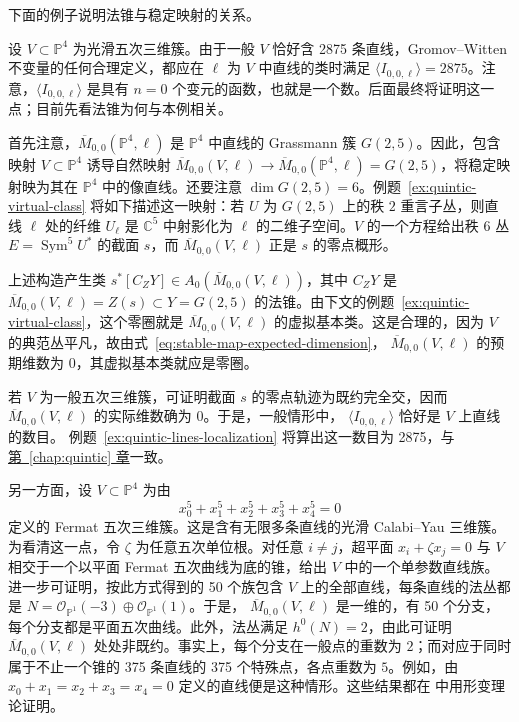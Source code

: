 下面的例子说明法锥与稳定映射的关系。

\begin{example}\label{ex:quintic-lines-normal-cone}
设 $V\subset\mathbb P^4$ 为光滑五次三维簇。由于一般 $V$ 恰好含 2875 条直线，Gromov--Witten 不变量的任何合理定义，都应在 $\ell$ 为 $V$ 中直线的类时满足
$\langle I_{0,0,\ell}\rangle=2875$。注意，$\langle I_{0,0,\ell}\rangle$ 是具有 $n=0$ 个变元的函数，也就是一个数。后面最终将证明这一点；目前先看法锥为何与本例相关。

首先注意，$\overline M_{0,0}(\mathbb P^4,\ell)$ 是 $\mathbb P^4$ 中直线的 Grassmann 簇 $G(2,5)$。因此，包含映射 $V\subset\mathbb P^4$ 诱导自然映射
$\overline M_{0,0}(V,\ell)\to\overline M_{0,0}(\mathbb P^4,\ell)=G(2,5)$，将稳定映射映为其在 $\mathbb P^4$ 中的像直线。还要注意 $\dim G(2,5)=6$。例题~\ref{ex:quintic-virtual-class} 将如下描述这一映射：若 $U$ 为 $G(2,5)$ 上的秩 $2$ 重言子丛，则直线 $\ell$ 处的纤维 $U_\ell$ 是 $\mathbb C^5$ 中射影化为 $\ell$ 的二维子空间。$V$ 的一个方程给出秩 $6$ 丛 $E=\operatorname{Sym}^5U^*$ 的截面 $s$，而 $\overline M_{0,0}(V,\ell)$ 正是 $s$ 的零点概形。

上述构造产生类 $s^*[C_ZY]\in A_0(\overline M_{0,0}(V,\ell))$，其中
$C_ZY$ 是 $\overline M_{0,0}(V,\ell)=Z(s)\subset Y=G(2,5)$ 的法锥。由下文的例题~\ref{ex:quintic-virtual-class}，这个零圈就是 $\overline M_{0,0}(V,\ell)$ 的虚拟基本类。这是合理的，因为 $V$ 的典范丛平凡，故由式~\eqref{eq:stable-map-expected-dimension}，
$\overline M_{0,0}(V,\ell)$ 的预期维数为 $0$，其虚拟基本类就应是零圈。

若 $V$ 为一般五次三维簇，可证明截面 $s$ 的零点轨迹为既约完全交，因而
$\overline M_{0,0}(V,\ell)$ 的实际维数确为 $0$。于是，一般情形中，
$\langle I_{0,0,\ell}\rangle$ 恰好是 $V$ 上直线的数目。
例题~\ref{ex:quintic-lines-localization} 将算出这一数目为 2875，与\hyperref[chap:quintic]{第~\ref*{chap:quintic} 章}一致。

另一方面，设 $V\subset\mathbb P^4$ 为由
\[
x_0^5+x_1^5+x_2^5+x_3^5+x_4^5=0
\]
定义的 Fermat 五次三维簇。这是含有无限多条直线的光滑 Calabi--Yau 三维簇。为看清这一点，令 $\zeta$ 为任意五次单位根。对任意 $i\ne j$，超平面
$x_i+\zeta x_j=0$ 与 $V$ 相交于一个以平面 Fermat 五次曲线为底的锥，给出 $V$ 中的一个单参数直线族。进一步可证明，按此方式得到的 50 个族包含 $V$ 上的全部直线，每条直线的法丛都是
$N=\mathcal O_{\mathbb P^1}(-3)\oplus\mathcal O_{\mathbb P^1}(1)$。于是，
$\overline M_{0,0}(V,\ell)$ 是一维的，有 50 个分支，每个分支都是平面五次曲线。此外，法丛满足 $h^0(N)=2$，由此可证明 $\overline M_{0,0}(V,\ell)$ 处处非既约。事实上，每个分支在一般点的重数为 $2$；而对应于同时属于不止一个锥的 375 条直线的 375 个特殊点，各点重数为 $5$。例如，由
$x_0+x_1=x_2+x_3=x_4=0$ 定义的直线便是这种情形。这些结果都在  中用形变理论证明。


\end{example}
